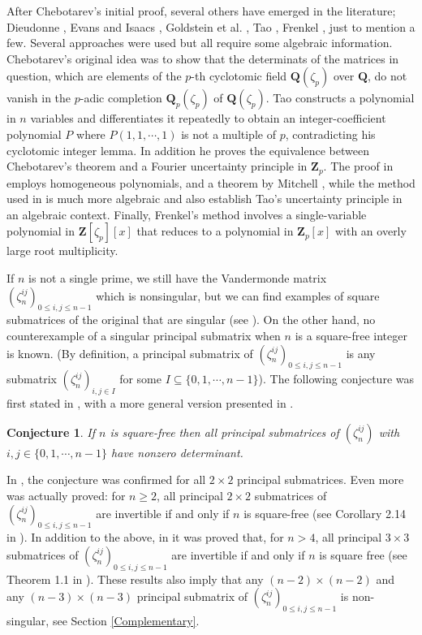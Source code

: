 \documentclass[a4paper,12pt,reqno]{amsart}
\newtheorem{conjecture}{Conjecture}
\def\Z{\mathbf{Z}}
\def\Q{\mathbf{Q}}
\begin{document}
After Chebotarev's initial proof, several others have emerged in the literature; Dieudonne \cite{Dieudonne}, Evans and Isaacs \cite{EvIs}, Goldstein et al. \cite{Gold},  Tao \cite{Tao}, Frenkel \cite{Frenkel},
 just to mention a few. Several approaches were used but  all require some  algebraic information. Chebotarev's original idea was to show that the 
  determinats of the matrices in question, which are  elements of the $p$-th cyclotomic field $\Q(\zeta_p)$ over $\Q$,  do not vanish in the $p$-adic completion $\Q_p(\zeta_p)$  of $\Q(\zeta_p)$. Tao \cite{Tao} constructs a polynomial in $n$ variables and differentiates it repeatedly to obtain an integer-coefficient polynomial $P$ where $P(1, 1, \cdots , 1)$ is not a multiple of $p$, contradicting his cyclotomic integer lemma. In addition he  proves the equivalence between Chebotarev's theorem and a Fourier uncertainty principle in $\Z_p$. The proof in  \cite{EvIs} employs homogeneous polynomials, and  a theorem by Mitchell \cite{Mitchell}, while  the method used in  \cite{Gold} is much more algebraic and also establish Tao's uncertainty principle in an algebraic context. Finally, Frenkel's method involves a single-variable polynomial in $\Z[\zeta_p][x]$ that reduces to a polynomial in $\Z_p[x]$ with an overly large root multiplicity.

 If $n$ is not a single prime, we still have the Vandermonde matrix $(\zeta_n^{ij})_{0 \leq i, j \leq n-1}$ which is nonsingular, but we can find examples of square submatrices of the original that are singular (see \cite{CL.24}). On the other hand, no counterexample of a singular principal submatrix when $n$ is a square-free integer is known.  (By definition, a principal submatrix  of $(\zeta_n^{ij})_{0 \leq i,j \leq n-1}$ is any submatrix $(\zeta_n^{ij})_{i,j \in I}$ for   some $I \subseteq \{0, 1, \cdots, n-1 \}$).  The following conjecture was first stated in \cite{Cabreli}, with a more general version presented in \cite{CL.24}.
 \begin{conjecture}\label{Conjecture}
 If $n$ is square-free then all principal submatrices of $(\zeta_n^{ij})$ with $i,j \in \{ 0, 1, \cdots, n-1\}$
 have nonzero determinant.     
 \end{conjecture}

In \cite{Cabreli}, the conjecture was confirmed for all $2 \times 2$ principal submatrices. Even more was actually proved:  for $n \geq 2$, all principal $2 \times 2$ submatrices of $(\zeta_n^{ij})_{0\leq i,j \leq n-1}$ are invertible if and only if $n$ is square-free (see Corollary 2.14 in \cite{Cabreli}).
  In addition to the above,  in \cite{CL.24} it was proved that, for $n >4$,  all principal  $3 \times 3$ submatrices of
 $(\zeta_n^{ij})_{0\leq i,j \leq n-1}$ are invertible if and only if $n$ is square free (see Theorem 1.1 in \cite{CL.24}).
These  results also imply that  any  $(n-2) \times (n-2)$ and any  $(n-3) \times (n-3)$ principal submatrix 
of $(\zeta_n^{ij})_{0\leq i,j \leq n-1}$ is non-singular, see Section \ref{Complementary}.
\end{document}
